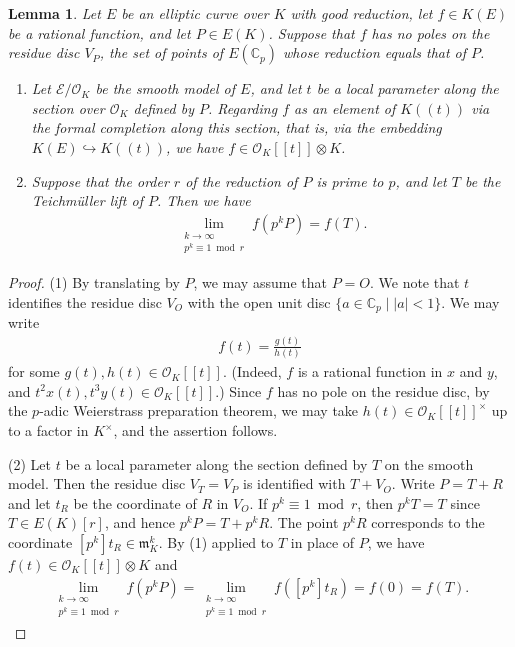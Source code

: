 \documentclass[10pt,a4paper]{amsart}
\newtheorem{lem}{Lemma}
\newcommand{\C}{\mathbb{C}}
\begin{document}
\begin{lem}\label{pWPT}
Let $E$ be an elliptic curve over $K$ with good reduction, let
$f \in K(E)$ be a rational function, and let $P \in E(K)$.
Suppose that $f$ has no poles on the residue disc
$V_P$, the set of points of $E(\mathbb{C}_p)$ whose 
reduction equals that of $P$. 

\begin{enumerate}
\item Let $\mathcal{E}/\mathcal{O}_K$ be the smooth model of $E$, and let
$t$ be a local parameter along the section over $\mathcal{O}_K$ defined by
$P$. 
Regarding $f$ as an element of $K((t))$ via the formal completion along
this section, that is, via the embedding $K(E) \hookrightarrow K((t))$,
we have $f \in \mathcal{O}_K[[t]] \otimes K$.
\item Suppose that the order $r$ of the reduction of $P$ is prime to $p$,
and let $T$ be the Teichm\"{u}ller lift of $P$. Then we have
%
\begin{align*}
\lim_{\substack {k \to \infty \\ p^k \equiv 1 \bmod r}} f(p^kP)=f(T).
\end{align*}
%
\end{enumerate}
\end{lem}

\begin{proof}
\noindent\textup{(1)} By translating by $P$, we may assume that $P=O$.
We note that $t$ identifies the residue disc $V_O$ with the open unit disc $\{ a \in \C_p \mid |a|<1\}$. 
We may write
%
\begin{align*}
f(t)=\frac{g(t)}{h(t)}
\end{align*}
%
for some $g(t), h(t) \in \mathcal{O}_K[[t]]$.
(Indeed, $f$ is a rational function in $x$ and $y$, and $t^2x(t), t^3y(t) \in  \mathcal{O}_K[[t]]$.)
Since $f$ has no pole on the residue disc, by the $p$-adic Weierstrass preparation theorem, 
we may take 
$h(t)\in \mathcal{O}_K[[t]]^{\times}$ up to a factor in $K^{\times}$, and the assertion follows. 

\medskip
\noindent\textup{(2)} Let $t$ be a local parameter along the section defined by $T$ on the smooth model.
Then the residue disc $V_T=V_P$ is identified with $T+V_O$.
Write $P=T+R$ and let $t_R$ be the coordinate of $R$ in $V_O$.
If $p^k \equiv 1 \bmod r$, then $p^kT=T$ since $T \in E(K)[r]$, and hence $p^kP=T+p^kR$. 
The point $p^kR$ corresponds to the coordinate 
$[p^k]t_R \in \mathfrak{m}_K^k$. 
By (1) applied to $T$ in place of $P$, we have  $f(t) \in \mathcal{O}_K[[t]] \otimes K$ and  
%
\begin{align*}
\lim_{\substack {k \to \infty \\ p^k \equiv 1 \bmod r}} f(p^kP)
=\lim_{\substack {k \to \infty \\ p^k \equiv 1 \bmod r}} f([p^k]t_R)
=f(0)=f(T).
\end{align*}
%
\end{proof}
\end{document}
